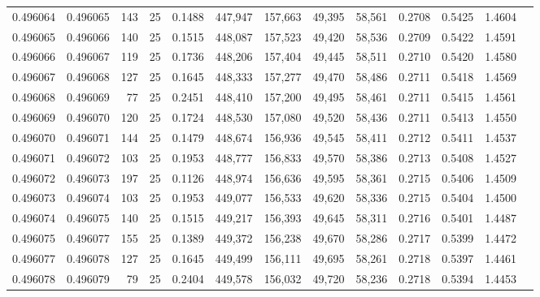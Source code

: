 \begin{tabular}{rrrrrrrrrrrrr}
0.496064 & 0.496065 &   143 &  25 &                                     0.1488 & 447,947 & 157,663 &  49,395 &  58,561 & 0.2708 & 0.5425 & 1.4604 \\
0.496065 & 0.496066 &   140 &  25 &                                     0.1515 & 448,087 & 157,523 &  49,420 &  58,536 & 0.2709 & 0.5422 & 1.4591 \\
0.496066 & 0.496067 &   119 &  25 &                                     0.1736 & 448,206 & 157,404 &  49,445 &  58,511 & 0.2710 & 0.5420 & 1.4580 \\
0.496067 & 0.496068 &   127 &  25 &                                     0.1645 & 448,333 & 157,277 &  49,470 &  58,486 & 0.2711 & 0.5418 & 1.4569 \\
0.496068 & 0.496069 &    77 &  25 &                                     0.2451 & 448,410 & 157,200 &  49,495 &  58,461 & 0.2711 & 0.5415 & 1.4561 \\
0.496069 & 0.496070 &   120 &  25 &                                     0.1724 & 448,530 & 157,080 &  49,520 &  58,436 & 0.2711 & 0.5413 & 1.4550 \\
0.496070 & 0.496071 &   144 &  25 &                                     0.1479 & 448,674 & 156,936 &  49,545 &  58,411 & 0.2712 & 0.5411 & 1.4537 \\
0.496071 & 0.496072 &   103 &  25 &                                     0.1953 & 448,777 & 156,833 &  49,570 &  58,386 & 0.2713 & 0.5408 & 1.4527 \\
0.496072 & 0.496073 &   197 &  25 &                                     0.1126 & 448,974 & 156,636 &  49,595 &  58,361 & 0.2715 & 0.5406 & 1.4509 \\
0.496073 & 0.496074 &   103 &  25 &                                     0.1953 & 449,077 & 156,533 &  49,620 &  58,336 & 0.2715 & 0.5404 & 1.4500 \\
0.496074 & 0.496075 &   140 &  25 &                                     0.1515 & 449,217 & 156,393 &  49,645 &  58,311 & 0.2716 & 0.5401 & 1.4487 \\
0.496075 & 0.496077 &   155 &  25 &                                     0.1389 & 449,372 & 156,238 &  49,670 &  58,286 & 0.2717 & 0.5399 & 1.4472 \\
0.496077 & 0.496078 &   127 &  25 &                                     0.1645 & 449,499 & 156,111 &  49,695 &  58,261 & 0.2718 & 0.5397 & 1.4461 \\
0.496078 & 0.496079 &    79 &  25 &                                     0.2404 & 449,578 & 156,032 &  49,720 &  58,236 & 0.2718 & 0.5394 & 1.4453 \\

\end{tabular}
